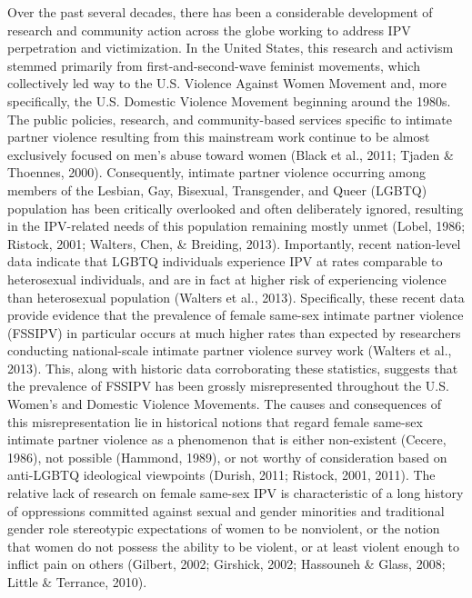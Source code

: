 \documentclass[11pt,]{tufte-book}
\begin{document}
Over the past several decades, there has been a considerable development
of research and community action across the globe working to address IPV
perpetration and victimization. In the United States, this research and
activism stemmed primarily from first-and-second-wave feminist
movements, which collectively led way to the U.S. Violence Against Women
Movement and, more specifically, the U.S. Domestic Violence Movement
beginning around the 1980s. The public policies, research, and
community-based services specific to intimate partner violence resulting
from this mainstream work continue to be almost exclusively focused on
men's abuse toward women (Black et al., 2011; Tjaden \& Thoennes, 2000).
Consequently, intimate partner violence occurring among members of the
Lesbian, Gay, Bisexual, Transgender, and Queer (LGBTQ) population has
been critically overlooked and often deliberately ignored, resulting in
the IPV-related needs of this population remaining mostly unmet (Lobel,
1986; Ristock, 2001; Walters, Chen, \& Breiding, 2013). Importantly,
recent nation-level data indicate that LGBTQ individuals experience IPV
at rates comparable to heterosexual individuals, and are in fact at
higher risk of experiencing violence than heterosexual population
(Walters et al., 2013). Specifically, these recent data provide evidence
that the prevalence of female same-sex intimate partner violence
(FSSIPV) in particular occurs at much higher rates than expected by
researchers conducting national-scale intimate partner violence survey
work (Walters et al., 2013). This, along with historic data
corroborating these statistics, suggests that the prevalence of FSSIPV
has been grossly misrepresented throughout the U.S. Women's and Domestic
Violence Movements. The causes and consequences of this
misrepresentation lie in historical notions that regard female same-sex
intimate partner violence as a phenomenon that is either non-existent
(Cecere, 1986), not possible (Hammond, 1989), or not worthy of
consideration based on anti-LGBTQ ideological viewpoints (Durish, 2011;
Ristock, 2001, 2011). The relative lack of research on female same-sex
IPV is characteristic of a long history of oppressions committed against
sexual and gender minorities and traditional gender role stereotypic
expectations of women to be nonviolent, or the notion that women do not
possess the ability to be violent, or at least violent enough to inflict
pain on others (Gilbert, 2002; Girshick, 2002; Hassouneh \& Glass, 2008;
Little \& Terrance, 2010).
\end{document}
